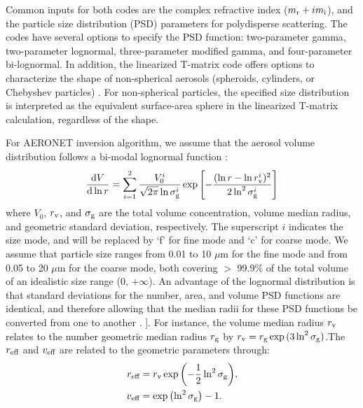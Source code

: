 Common inputs for both codes are the complex refractive index
($m_\text{r} + im_\text{i}$), and the particle size distribution (PSD) 
parameters for polydisperse scattering. The codes have several options 
to specify the PSD function: two-parameter gamma, two-parameter 
lognormal, three-parameter modified gamma, and four-parameter bi-lognormal. 
In addition, the linearized T-matrix code offers options to characterize the 
shape of non-spherical aerosols (spheroids, cylinders, or Chebyshev particles)
\citep{Spurr12}. For non-spherical particles, the specified size distribution 
is interpreted as the equivalent surface-area sphere in the linearized T-matrix
calculation, regardless of the shape. 

For AERONET inversion algorithm, we assume that the aerosol volume
distribution follows a bi-modal lognormal function \citep[in agreement
wit][]{Schuster06, Waquet09}:
\begin{equation}
\frac{\text{d}V}{\text{d}\ln{r}} = \sum_{i=1}^2 
\frac{V_0^i}{\sqrt{2\pi}\ln{\sigma_\text{g}^i}} 
\exp{\left[ -\frac{(\ln{r}-\ln{r_\text{v}^i})^2}{2\ln^2{\sigma_\text{g}^i}}\right]}
\label{eq:bilognormal}
\end{equation}
where $V_0$, $r_\text{v}$, and $\sigma_\text{g}$ are the total volume concentration, volume
median radius, and geometric standard deviation, respectively. The superscript $i$
indicates the size mode, and will be replaced by `f' for fine mode
and `c' for coarse mode. We assume that particle size ranges from 0.01
to 10 $\mu$m for the fine mode and from 0.05 to 20 $\mu$m for
the coarse mode, both covering $>$ 99.9\% of the total volume of an 
idealistic size range (0, $+\infty$). An advantage of the lognormal 
distribution is that standard deviations for the number, area, and 
volume PSD functions are identical, and therefore allowing that the 
median radii for these PSD functions be converted from one to 
another \citep{Seinfeld06}. ]. For instance, the volume median radius
$r_\text{v}$ relates to the number geometric median radius $r_\text{g}$ by $r_\text{v} = r_\text{g}
\exp{(3\ln^2{\sigma_\text{g}})}$.The $r_\text{eff}$ and $v_\text{eff}$ are related to 
the geometric parameters through:
\begin{align}
r_\text{eff} &= r_\text{v} \exp{\left( -\frac{1}{2} \ln^2{\sigma_\text{g}}\right)}, \\
v_\text{eff} & = \exp{\left(\ln^2{\sigma_\text{g}}\right)} - 1.
\end{align}

